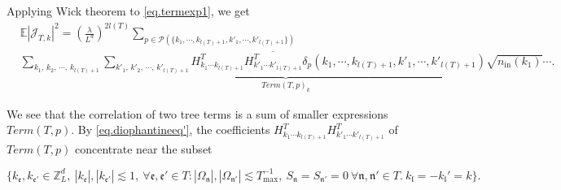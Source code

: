 Applying Wick theorem to \eqref{eq.termexp1}, we get
\begin{equation}\label{eq.termexp'}
\begin{split}
    &\mathbb{E}|\mathcal{J}_{T,k}|^2=\left(\frac{\lambda}{L^{d}}\right)^{2l(T)}
    \sum_{p\in \mathcal{P}(\{k_1,\cdots, k_{l(T)+1}, k'_1,\cdots, k'_{l(T)+1}\})}
    \\[0.5em]
    & \underbrace{\sum_{k_1,\, k_2,\, \cdots,\, k_{l(T)+1}}\sum_{k'_1,\, k'_2,\, \cdots,\, k'_{l(T)+1}} H^T_{k_1\cdots k_{l(T)+1}} \overline{H^{T}_{k'_1\cdots k'_{l(T)+1}}} \delta_{p}(k_1,\cdots, k_{l(T)+1}, k'_1,\cdots, k'_{l(T)+1})\sqrt{n_{\textrm{in}}(k_1)}\cdots}_{Term(T, p)_k}.
\end{split}
\end{equation}

We see that the correlation of two tree terms is a sum of smaller expressions $Term(T, p)$. By \eqref{eq.diophantineeq'}, the coefficients $H^T_{k_1\cdots k_{l(T)+1}} H^{T}_{k'_1\cdots k'_{l(T)+1}}$ of $Term(T, p)$ concentrate near the subset 

\begin{equation}\label{eq.diophantineequnpaired}
\{k_{\mathfrak{e}}, k_{\mathfrak{e}'}\in \mathbb{Z}^d_L,\ |k_{\mathfrak{e}}|, |k_{\mathfrak{e}'}|\lesssim 1,\ \forall \mathfrak{e},\mathfrak{e}'\in T:|\Omega_{\mathfrak{n}}|,|\Omega_{\mathfrak{n}'}|\lesssim T^{-1}_{\text{max}},\ S_{\mathfrak{n}}=S_{\mathfrak{n}'}=0\ \forall \mathfrak{n},\mathfrak{n}'\in T.\ k_{\mathfrak{l}}=-k_{\mathfrak{l}}'=k\}.
\end{equation}


